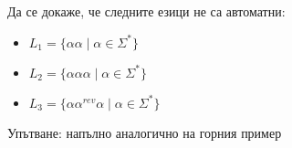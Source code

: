 \pagebreak

\begin{problem}
Да се докаже, че следните езици не са автоматни:
\begin{itemize}
    \item $L_1 = \{ \alpha \alpha \mid \alpha \in \Sigma^* \}$
    \item $L_2 = \{ \alpha \alpha \alpha \mid \alpha \in \Sigma^* \}$
    \item $L_3 = \{ \alpha \alpha^{rev} \alpha \mid \alpha \in \Sigma^* \}$
\end{itemize}
Упътване: напълно аналогично на горния пример
\end{problem}